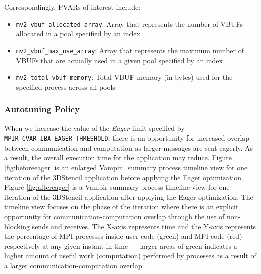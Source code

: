 Correspondingly, PVARs of interest include:
\begin{itemize}
  \item \verb+mv2_vbuf_allocated_array+: Array that represents the number of VBUFs allocated in a pool specified by an index
  \item \verb+mv2_vbuf_max_use_array+: Array that represents the maximum number of VBUFs that are actually used in a given pool specified by an index
  \item \verb+mv2_total_vbuf_memory+: Total VBUF memory (in bytes) used for the specified process across all pools
\end{itemize}

\subsubsection{Autotuning Policy}
When we increase the value of the \emph{Eager} limit specified by \verb+MPIR_CVAR_IBA_EAGER_THRESHOLD+, there is an opportunity for increased overlap between communication and computation as larger messages are sent eagerly. As a result, the overall execution time for the application may reduce. Figure \ref{fig:beforeeager} is an enlarged Vampir~\cite{Vampir} summary process timeline view for one iteration of the 3DStencil application before applying the Eager optimization. Figure \ref{fig:aftereager} is a Vampir summary process timeline view for one iteration of the 3DStencil application after applying the Eager optimization. The timeline view focuses on the phase of the iteration where there is an explicit opportunity for communication-computation overlap through the use of non-blocking sends and receives. The X-axis represents time and the Y-axis represents the percentage of MPI processes inside user code (green) and MPI code (red) respectively at any given instant in time --- larger areas of green indicates a higher amount of useful work (computation) performed by processes as a result of a larger communication-computation overlap. 

